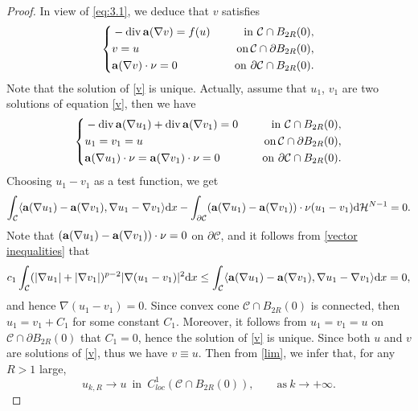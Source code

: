 \documentclass[12pt]{amsart}
\theoremstyle{definition}
\theoremstyle{remark}
\theoremstyle{conclusion}
\theoremstyle{conjecture}
\numberwithin{equation}{section}
\begin{document}
\begin{proof}
\smallskip

In view of \eqref{eq:3.1}, we deduce that $v$ satisfies
 \begin{equation}\label{v}
     \left\{
         \begin{aligned}
         & -\operatorname{div}{\bf{a}}(\nabla v)=f(u)\quad \, &{\rm{in}}\,\, \mathcal{C}\cap B_{2R}(0),\\
         &v=u \quad \, &{\rm{on}}\, \mathcal{C}\cap \partial B_{2R}(0),\\
         &{\bf{a}}(\nabla v)\cdot \nu =0\quad\, &{\rm{on}}\,\, \partial\mathcal{C}\cap B_{2R}(0).
         \end{aligned}
         \right.
 \end{equation}
 Note that the solution of \eqref{v} is unique. Actually, assume that $u_1$, $v_1$ are two solutions of equation \eqref{v}, then we have
 \begin{equation*}
     \left\{
         \begin{aligned}
         & -\operatorname{div}{\bf{a}}(\nabla u_1)+\operatorname{div}{\bf{a}}(\nabla v_1)=0\quad \, &{\rm{in}}\,\, \mathcal{C}\cap B_{2R}(0),\\
         &u_1=v_1=u \quad \, &{\rm{on}}\, \mathcal{C}\cap \partial B_{2R}(0),\\
         &{\bf{a}}(\nabla u_1)\cdot \nu ={\bf{a}}(\nabla v_1)\cdot \nu=0\quad\, &{\rm{on}}\,\, \partial\mathcal{C}\cap B_{2R}(0).
         \end{aligned}
         \right.
 \end{equation*}
Choosing $u_1-v_1$ as a test function, we get
$$\int_{\mathcal{C}}\langle {\bf{a}}(\nabla u_1)-{\bf{a}}(\nabla v_1), \nabla u_1-\nabla v_1\rangle {\rm{d}}x-\int_{\partial\mathcal{C}} ({\bf{a}}(\nabla u_1)-{\bf{a}}(\nabla v_1))\cdot \nu(u_1-v_1){\rm{d}}\mathcal{H}^{N-1}=0.$$
Note that $({\bf{a}}(\nabla u_1)-{\bf{a}}(\nabla v_1))\cdot \nu=0$ on $\partial\mathcal{C}$, and it follows from \eqref{vector inequalities} that
\begin{equation*}
     c_1\int_{\mathcal{C}}(|\nabla u_1|+|\nabla v_1|)^{p-2}|\nabla(u_1-v_1)|^2{\rm {d}}x\leq\int_{\mathcal{C}}\langle {\bf{a}}(\nabla u_1)-{\bf{a}}(\nabla v_1), \nabla u_1-\nabla v_1\rangle {\rm{d}}x=0,
\end{equation*}
and hence $\nabla(u_1-v_1)=0$. Since convex cone $\mathcal{C}\cap B_{2R}(0)$ is connected, then $u_1=v_1+C_1$ for some constant $C_1$. Moreover, it follows from $u_1=v_1=u$ on $\mathcal{C}\cap \partial B_{2R}(0)$ that $C_1=0$, hence the solution of \eqref{v} is unique. Since both $u$ and $v$ are solutions of \eqref{v}, thus we have $v\equiv u$. Then from \eqref{lim}, we infer that, for any $R>1$ large,
\begin{equation}\label{lim2}
    u_{k,R}\rightarrow u\,\,\, \text{in}\,\,\, C^{1}_{loc}(\mathcal{C}\cap B_{2R}(0)),\qquad \text{as}\ k\rightarrow+\infty.
\end{equation}


\end{proof}
\end{document}
